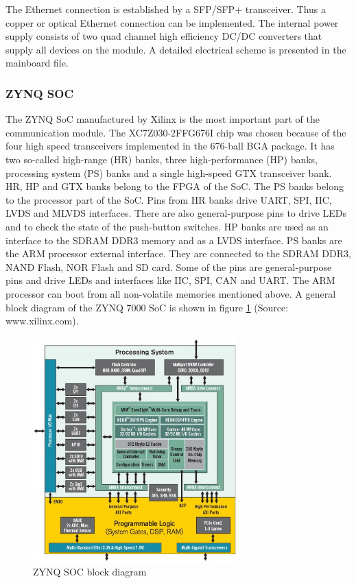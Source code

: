 The Ethernet connection is established by a SFP/SFP+ transceiver. Thus a copper or optical Ethernet connection can be implemented. The internal power supply consists of two quad channel high efficiency DC/DC converters that supply all devices on the module. A detailed electrical scheme is presented in the mainboard file.
\subsubsection{ZYNQ SOC}
The ZYNQ SoC manufactured by Xilinx is the most important part of the communication module. The XC7Z030-2FFG676I chip was chosen because of the four high speed transceivers implemented in the 676-ball BGA package.
It has two so-called high-range (HR) banks, three high-performance (HP) banks, processing system (PS) banks and a single high-speed GTX transceiver bank. HR, HP and GTX banks belong to the FPGA of the SoC. The PS banks belong to the processor part of the SoC.
Pins from HR banks drive UART, SPI, IIC, LVDS and MLVDS interfaces. There are also general-purpose pins to drive LEDs and to check the state of the push-button switches.
HP banks are used as an interface to the SDRAM DDR3 memory and as a LVDS interface.
PS banks are the ARM processor external interface. They are connected to the SDRAM DDR3, NAND Flash, NOR Flash and SD card. Some of the pins are general-purpose pins and drive LEDs and interfaces like IIC, SPI, CAN and UART. The ARM processor can boot from all non-volatile memories mentioned above. 
A general block diagram of the ZYNQ 7000 SoC is shown in figure \ref{fig:zynq} (Source: www.xilinx.com).

\begin{figure}[H]
\centering
\includegraphics[width=0.7\textwidth]{pict/zynq.png}
\caption{ZYNQ SOC block diagram}
\label{fig:zynq}
\end{figure}

